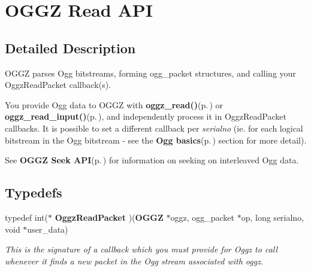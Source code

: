 \section{OGGZ Read API}
\label{group__read__api}


\subsection{Detailed Description}
OGGZ parses Ogg bitstreams, forming ogg\_\-packet structures, and calling your Oggz\-Read\-Packet callback(s). 

You provide Ogg data to OGGZ with {\bf oggz\_\-read()}{\rm (p.\,\pageref{group__read__api_ga2})} or {\bf oggz\_\-read\_\-input()}{\rm (p.\,\pageref{group__read__api_ga3})}, and independently process it in Oggz\-Read\-Packet callbacks. It is possible to set a different callback per {\em serialno\/} (ie. for each logical bitstream in the Ogg bitstream - see the {\bf Ogg basics}{\rm (p.\,\pageref{group__basics})} section for more detail).

See {\bf OGGZ Seek API}{\rm (p.\,\pageref{group__seek__api})} for information on seeking on interleaved Ogg data. 

\subsection*{Typedefs}
\begin{CompactItemize}
\item 
typedef int($\ast$ {\bf Oggz\-Read\-Packet} )({\bf OGGZ} $\ast$oggz, ogg\_\-packet $\ast$op, long serialno, void $\ast$user\_\-data)
\begin{CompactList}\small\item\em This is the signature of a callback which you must provide for Oggz to call whenever it finds a new packet in the Ogg stream associated with {\em oggz\/}. \item\end{CompactList}\end{CompactItemize}
